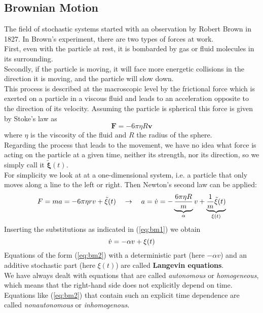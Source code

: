 \subsection{Brownian Motion}
The field of stochastic systems started with an observation by Robert Brown in 1827.
In Brown’s experiment, there are two types of forces at work.\\
First, even with the particle at rest, it is bombarded by gas or fluid molecules in its surrounding.\\
Secondly, if the particle is moving, it will face more energetic collisions in the direction it is moving, and the particle will slow down.\\
This process is described at the macroscopic level by the frictional force which is exerted on a particle in a viscous fluid and leads to an acceleration opposite to the direction of its velocity.
Assuming the particle is spherical this force is given by Stoke’s law as
\begin{equation}
	\mathbf{F}=-6\pi\eta R\mathbf{v}
\end{equation}
where $\eta$ is the viscosity of the fluid and $R$ the radius of the sphere.\\
Regarding the process that leads to the movement, we have no idea what force is acting on the particle at a given time, neither its strength, nor its direction, so we simply call it $\mathbf{\tilde{\xi}}(t)$.\\
For simplicity we look at at a one-dimensional system, i.e. a particle that only moves along a line to the left or right. Then Newton’s second law can be applied:
\begin{equation}{\label{eq:bm1}}
	F=ma=-6\pi\eta rv+\tilde{\xi}(t)\quad\rightarrow\quad a=\dot{v}=-\underbrace{\frac{6\pi\eta R}{m}}_{\alpha}v+\underbrace{\frac{1}{m}\tilde{\xi}(t)}_{\xi(t)}
\end{equation}
Inserting the substitutions as indicated in (\ref{eq:bm1}) we obtain
\begin{equation}{\label{eq:bm2}}
	\dot{v}=-\alpha v+\xi(t)
\end{equation}
Equations of the form (\ref{eq:bm2}) with a deterministic part (here $-\alpha v$) and an additive stochastic part (here $\xi(t)$) are called \textbf{Langevin equations}.\\
We have always dealt with equations that are called \emph{autonomous} or \emph{homogeneous}, which means that the right-hand side does not explicitly depend on time.
Equations like (\ref{eq:bm2}) that contain such an explicit time dependence are called \emph{nonautonomous} or \emph{inhomogenous}.
